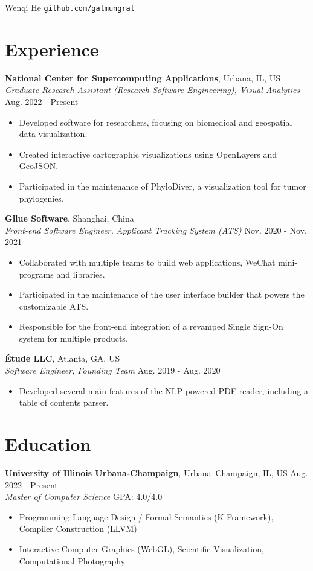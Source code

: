 \documentclass[12pt]{article}
\begin{document}
{\Huge Wenqi He} \quad \texttt{github.com/galmungral}

\section*{Experience}

\textbf{National Center for Supercomputing Applications}, Urbana, IL, US\\
\textit{Graduate Research Assistant (Research Software Engineering), Visual Analytics} \hfill Aug. 2022 - Present
\begin{itemize}
\item Developed software for researchers, focusing on biomedical and geospatial data visualization.
\item Created interactive cartographic visualizations using OpenLayers and GeoJSON.
\item Participated in the maintenance of PhyloDiver, a visualization tool for tumor phylogenies.
\end{itemize}

\textbf{Gllue Software}, Shanghai, China\\
\textit{Front-end Software Engineer, Applicant Tracking System (ATS)} \hfill Nov. 2020 - Nov. 2021
\begin{itemize}
\item Collaborated with multiple teams to build web applications, WeChat mini-programs and libraries.
\item Participated in the maintenance of the user interface builder that powers the customizable ATS.
\item Responsible for the front-end integration of a revamped Single Sign-On system for multiple products.
\end{itemize}

\textbf{Étude LLC}, Atlanta, GA, US\\
\textit{Software Engineer, Founding Team} \hfill Aug. 2019 - Aug. 2020
\begin{itemize}
\item Developed several main features of the NLP-powered PDF reader, including a table of contents parser.
\end{itemize}

\section*{Education}
\textbf{University of Illinois Urbana-Champaign}, Urbana–Champaign, IL, US \hfill Aug. 2022 - Present \\
\textit{Master of Computer Science}  \hfill GPA: 4.0/4.0 
\begin{itemize}
\small
\item Programming Language Design / Formal Semantics (K Framework), Compiler Construction (LLVM)
\item Interactive Computer Graphics (WebGL), Scientific Visualization, Computational Photography
\end{itemize}
\end{document}
